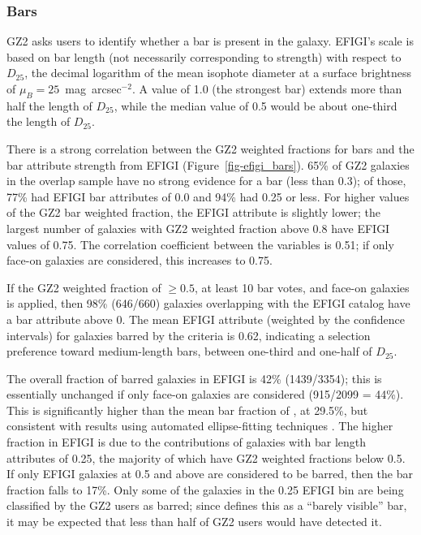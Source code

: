 \documentclass[useAMS,usenatbib]{mn2e}
\begin{document}
\subsubsection{Bars}

GZ2 asks users to identify whether a bar is present in the galaxy. EFIGI's scale is based on bar length (not necessarily corresponding to strength) with respect to $D_{25}$, the decimal logarithm of the mean isophote diameter at a surface brightness of $\mu_B=25$~mag~arcsec$^{-2}$. A value of 1.0 (the strongest bar) extends more than half the length of $D_{25}$, while the median value of 0.5 would be about one-third the length of $D_{25}$. 

There is a strong correlation between the GZ2 weighted fractions for bars and the bar attribute strength from EFIGI (Figure~\ref{fig-efigi_bars}). 65\% of GZ2 galaxies in the overlap sample have no strong evidence for a bar (less than 0.3); of those, 77\% had EFIGI bar attributes of 0.0 and 94\% had 0.25 or less. For higher values of the GZ2 bar weighted fraction, the EFIGI attribute is slightly lower; the largest number of galaxies with GZ2 weighted fraction above 0.8 have EFIGI values of 0.75. The correlation coefficient between the variables is 0.51; if only face-on galaxies are considered, this increases to 0.75. 

If the \citet{mas11c} GZ2 weighted fraction of $\geq0.5$, at least 10 bar votes, and face-on galaxies is applied, then 98\% (646/660) galaxies overlapping with the EFIGI catalog have a bar attribute above 0. The mean EFIGI attribute (weighted by the confidence intervals) for galaxies barred by the \citet{mas11c} criteria is 0.62, indicating a selection preference toward medium-length bars, between one-third and one-half of $D_{25}$. 

The overall fraction of barred galaxies in EFIGI is 42\% (1439/3354); this is essentially unchanged if only face-on galaxies are considered (915/2099 = 44\%). This is significantly higher than the mean bar fraction of \citet{mas11c}, at 29.5\%, but consistent with results using automated ellipse-fitting techniques \citep{bar08,agu09}. The higher fraction in EFIGI is due to the contributions of galaxies with bar length attributes of 0.25, the majority of which have GZ2 weighted fractions below 0.5. If only EFIGI galaxies at 0.5 and above are considered to be barred, then the bar fraction falls to 17\%. Only some of the galaxies in the 0.25 EFIGI bin are being classified by the GZ2 users as barred; since \citet{bai11} defines this as a ``barely visible'' bar, it may be expected that less than half of GZ2 users would have detected it. 
\end{document}
